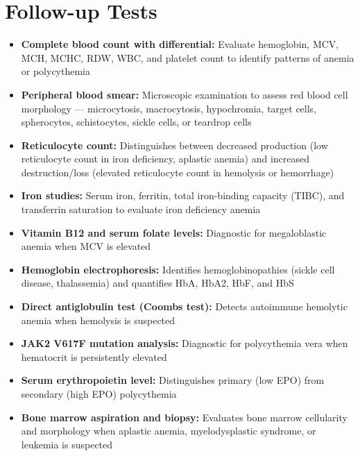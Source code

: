 \section*{Follow-up Tests}
\begin{itemize}
  \item \textbf{Complete blood count with differential:} Evaluate hemoglobin, MCV, MCH, MCHC, RDW, WBC, and platelet count to identify patterns of anemia or polycythemia
  \item \textbf{Peripheral blood smear:} Microscopic examination to assess red blood cell morphology --- microcytosis, macrocytosis, hypochromia, target cells, spherocytes, schistocytes, sickle cells, or teardrop cells
  \item \textbf{Reticulocyte count:} Distinguishes between decreased production (low reticulocyte count in iron deficiency, aplastic anemia) and increased destruction/loss (elevated reticulocyte count in hemolysis or hemorrhage)
  \item \textbf{Iron studies:} Serum iron, ferritin, total iron-binding capacity (TIBC), and transferrin saturation to evaluate iron deficiency anemia
  \item \textbf{Vitamin B12 and serum folate levels:} Diagnostic for megaloblastic anemia when MCV is elevated
  \item \textbf{Hemoglobin electrophoresis:} Identifies hemoglobinopathies (sickle cell disease, thalassemia) and quantifies HbA, HbA2, HbF, and HbS
  \item \textbf{Direct antiglobulin test (Coombs test):} Detects autoimmune hemolytic anemia when hemolysis is suspected
  \item \textbf{JAK2 V617F mutation analysis:} Diagnostic for polycythemia vera when hematocrit is persistently elevated
  \item \textbf{Serum erythropoietin level:} Distinguishes primary (low EPO) from secondary (high EPO) polycythemia
  \item \textbf{Bone marrow aspiration and biopsy:} Evaluates bone marrow cellularity and morphology when aplastic anemia, myelodysplastic syndrome, or leukemia is suspected
\end{itemize}

